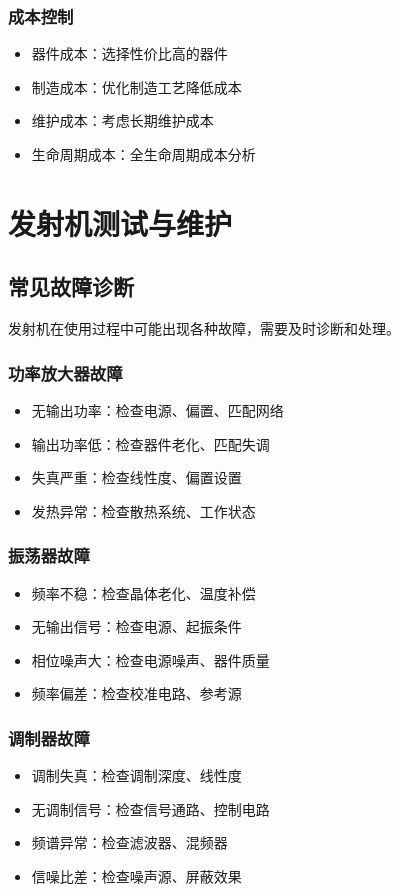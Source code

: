 \documentclass[12pt,UTF8]{ctexbook}
\begin{document}
\subsection{成本控制}
\begin{itemize}[leftmargin=3.5em]
    \item 器件成本：选择性价比高的器件
    \item 制造成本：优化制造工艺降低成本
    \item 维护成本：考虑长期维护成本
    \item 生命周期成本：全生命周期成本分析
\end{itemize}

\chapter{发射机测试与维护}

\section{常见故障诊断}

发射机在使用过程中可能出现各种故障，需要及时诊断和处理。

\subsection{功率放大器故障}
\begin{itemize}[leftmargin=3.5em]
    \item 无输出功率：检查电源、偏置、匹配网络
    \item 输出功率低：检查器件老化、匹配失调
    \item 失真严重：检查线性度、偏置设置
    \item 发热异常：检查散热系统、工作状态
\end{itemize}

\subsection{振荡器故障}
\begin{itemize}[leftmargin=3.5em]
    \item 频率不稳：检查晶体老化、温度补偿
    \item 无输出信号：检查电源、起振条件
    \item 相位噪声大：检查电源噪声、器件质量
    \item 频率偏差：检查校准电路、参考源
\end{itemize}

\subsection{调制器故障}
\begin{itemize}[leftmargin=3.5em]
    \item 调制失真：检查调制深度、线性度
    \item 无调制信号：检查信号通路、控制电路
    \item 频谱异常：检查滤波器、混频器
    \item 信噪比差：检查噪声源、屏蔽效果
\end{itemize}
\end{document}
